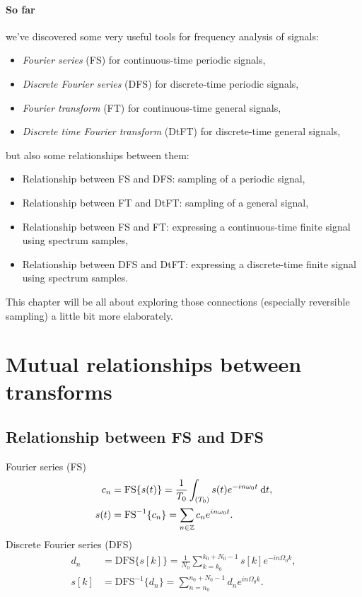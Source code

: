 \documentclass[11pt,a4paper]{report}
\theoremstyle{remark}
\theoremstyle{definition}
\begin{document}
		\paragraph{So far} we've discovered some very useful tools for frequency analysis of signals:
		\begin{itemize}
			\item \textit{Fourier series} (FS) for continuous-time periodic signals,
			\item \textit{Discrete Fourier series} (DFS) for discrete-time periodic signals,
			\item \textit{Fourier transform} (FT) for continuous-time general signals,
			\item \textit{Discrete time Fourier transform} (DtFT) for discrete-time general signals,
		\end{itemize}
		but also some relationships between them:
		\begin{itemize}
			\item Relationship between FS and DFS: sampling of a periodic signal,
			\item Relationship between FT and DtFT: sampling of a general signal,
			\item Relationship between FS and FT: expressing a continuous-time finite signal using spectrum samples,
			\item Relationship between DFS and DtFT: expressing a discrete-time finite signal using spectrum samples.
		\end{itemize}
		This chapter will be all about exploring those connections (especially reversible sampling) a little bit more elaborately.
		
		\section{Mutual relationships between transforms}
		
			\subsection{Relationship between FS and DFS}
				
				\noindent
				Fourier series (FS)
				\begin{align}
					c_n &= \mathrm{FS}\{ s(t) \} = \frac{1}{T_0} \int_{(T_0)} s(t) e^{-in\omega_0 t} \: {\mathrm d} t,
				\\
					s(t) &= \mathrm{FS}^{-1}\{ c_n \} = \sum_{n \in {\mathbb Z}} c_n e^{in\omega_0 t}.
				\end{align}
				Discrete Fourier series (DFS)
				\begin{align}
					d_n &= \mathrm{DFS}\{ s[k] \} = \frac{1}{N_0} \sum_{k=k_0}^{k_0+N_0-1} s[k] e^{-in\Omega_0 k},
				\\
					s[k] &= \mathrm{DFS}^{-1} \{ d_n \} = \sum_{n=n_0}^{n_0+N_0-1} d_n e^{in\Omega_0 k}.
				\end{align}
				
\end{document}

